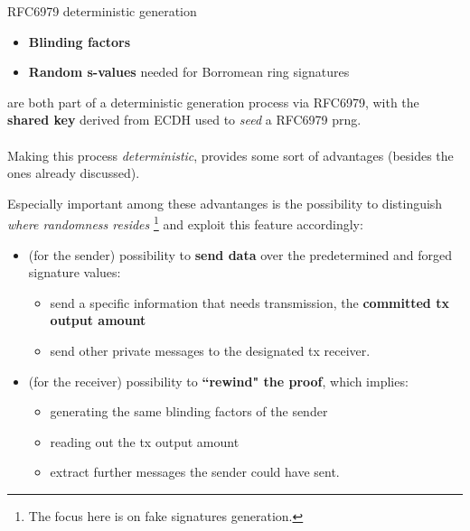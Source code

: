\documentclass[10.5pt,compress]{beamer}
\begin{document}
\begin{frame}{RFC6979 deterministic generation}
    \begin{itemize}
        \item \textbf{Blinding factors}
        \item \textbf{Random s-values} needed for Borromean ring signatures
    \end{itemize}
    are both part of a deterministic generation process via RFC6979, with the \textbf{shared key} derived from ECDH used to \textit{seed} a RFC6979 prng.\\ \ \\
    Making this process \textit{deterministic}, provides some sort of advantages (besides the ones already discussed).\\
\end{frame}

\begin{frame}
    Especially important among these advantanges is the possibility to distinguish \textit{where randomness resides} \footnote{\tiny{The focus here is on fake signatures generation.}} and exploit this feature accordingly:
    \begin{itemize}
        \item (for the sender) possibility to \textbf{send data} over the predetermined and forged signature values:
        \begin{itemize}
            \item send a specific information that needs transmission, the \textbf{committed tx output amount} %
            \item send other private messages to the designated tx receiver.
        \end{itemize}
        \item (for the receiver) possibility to \textbf{``rewind" the proof}, which implies:
        \begin{itemize}
            \item generating the same blinding factors of the sender
            \item reading out the tx output amount
            \item extract further messages the sender could have sent.
        \end{itemize}  
    \end{itemize}
\end{frame}
\end{document}
